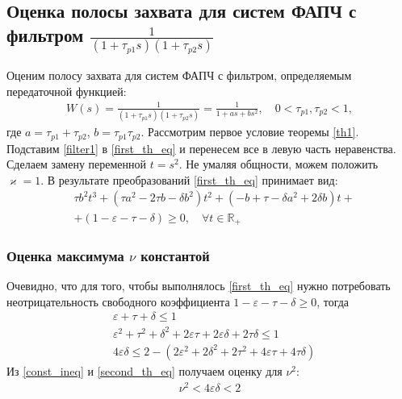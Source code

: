 \documentclass[a4paper,article,14pt]{extarticle}
\begin{document}
\subsection{Оценка полосы захвата для систем ФАПЧ с фильтром $\frac{1}{(1+\tau_{p1}s)(1+\tau_{p2}s)}$}
Оценим полосу захвата для систем ФАПЧ с фильтром, определяемым передаточной функцией:
 \begin{equation}\label{filter1}
 \begin{aligned}
W(s) = \frac{1}{(1+\tau_{p1}s)(1+\tau_{p2}s)} = \frac{1}{1+as + bs^2}, \quad 0<\tau_{p1},\tau_{p2} < 1,
 \end{aligned}
\end{equation}
где $a = \tau_{p1}+\tau_{p2}$, $b = \tau_{p1}\tau_{p2}$. Рассмотрим первое условие теоремы \ref{th1}. Подставим \eqref{filter1} в \eqref{first_th_eq} и перенесем все в левую часть неравенства. Сделаем замену переменной $t = s^2$. Не умаляя общности, можем положить $\varkappa = 1$. В результате преобразований \eqref{first_th_eq} принимает вид:
\begin{equation}\label{first_condition}
 \begin{aligned}
&\tau b^2t^3 + (\tau a^2-2 \tau b - \delta b^2)t^2 + (- b+\tau-\delta a^2 + 2\delta b)t +\\
&+ (1-\varepsilon-\tau-\delta) \geqslant 0, \quad \forall t \in \mathbb{R_+}
 \end{aligned}
\end{equation}

\subsubsection{Оценка максимума $\nu$ константой}
Очевидно, что для того, чтобы выполнялось \eqref{first_th_eq} нужно потребовать неотрицательность свободного коэффициента $1 - \varepsilon - \tau - \delta \geqslant 0$, тогда
 \begin{align}
&\varepsilon+\tau+\delta \leqslant 1 \\
&\varepsilon^2 + \tau^2 + \delta^2 + 2\varepsilon\tau + 2\varepsilon\delta + 2\tau\delta \leqslant 1\\
&4\varepsilon\delta \leqslant 2 -(2\varepsilon^2 + 2\delta^2 + 2\tau^2 +4\varepsilon\tau + 4\tau\delta)\label{const_ineq}
 \end{align}
Из \eqref{const_ineq} и \eqref{second_th_eq} получаем оценку для $\nu^2$:
\begin{equation}
 \begin{aligned}
\nu^2 < 4\varepsilon\delta < 2
 \end{aligned}
\end{equation}
\end{document}
